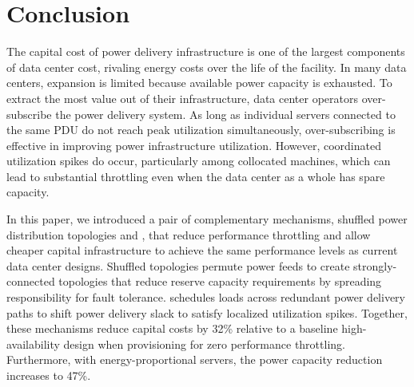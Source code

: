 \section{Conclusion}
\label{section::conclusion}

The capital cost of power delivery infrastructure is one of the largest components of data center cost, rivaling energy costs over the life of the facility.  In many data centers, expansion is limited because available power capacity is exhausted.  To extract the most value out of their infrastructure, data center operators over-subscribe the power delivery system.  As long as individual servers connected to the same PDU do not reach peak utilization simultaneously, over-subscribing is effective in improving power infrastructure utilization.  However, coordinated utilization spikes do occur, particularly among collocated machines, which can lead to substantial throttling even when the data center as a whole has spare capacity.

In this paper, we introduced a pair of complementary mechanisms, shuffled power distribution topologies and \PowerRouting, that reduce performance throttling and allow cheaper capital infrastructure to achieve the same performance levels as current data center designs.  Shuffled topologies permute power feeds to create strongly-connected topologies that reduce reserve capacity requirements by spreading responsibility for fault tolerance.  \PowerRouting schedules loads across redundant power delivery paths to shift power delivery slack to satisfy localized utilization spikes.  Together, these mechanisms reduce capital costs by 32\% relative to a baseline high-availability design when provisioning for zero performance throttling. Furthermore, with energy-proportional servers, the power capacity reduction increases to 47\%.
